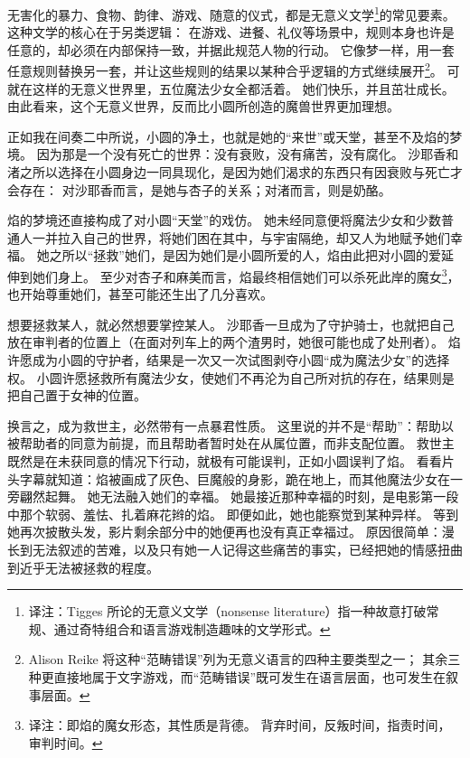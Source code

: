 无害化的暴力、食物、韵律、游戏、随意的仪式，都是无意义文学\footnote{
    译注：Tigges 所论的无意义文学（nonsense literature）指一种故意打破常规、通过奇特组合和语言游戏制造趣味的文学形式。
}的常见要素\cite{tigges1988themes-motifs-nonsense}。
这种文学的核心在于另类逻辑：
在游戏、进餐、礼仪等场景中，规则本身也许是任意的，却必须在内部保持一致，并据此规范人物的行动。
它像梦一样，用一套任意规则替换另一套，并让这些规则的结果以某种合乎逻辑的方式继续展开\footnote{%
    Alison Reike 将这种“范畴错误”列为无意义语言的四种主要类型之一；
    其余三种更直接地属于文字游戏，而“范畴错误”既可发生在语言层面，也可发生在叙事层面。
}\cite{reike1992secret-sense}。
可就在这样的无意义世界里，五位魔法少女全都活着。
她们快乐，并且茁壮成长。
由此看来，这个无意义世界，反而比小圆所创造的魔兽世界更加理想。

正如我在间奏二中所说，小圆的净土，也就是她的“来世”或天堂，甚至不及焰的梦境。
因为那是一个没有死亡的世界：没有衰败，没有痛苦，没有腐化。
沙耶香和渚之所以选择在小圆身边一同具现化，是因为她们渴求的东西只有因衰败与死亡才会存在：
对沙耶香而言，是她与杏子的关系；对渚而言，则是奶酪。

焰的梦境还直接构成了对小圆“天堂”的戏仿。
她未经同意便将魔法少女和少数普通人一并拉入自己的世界，将她们困在其中，与宇宙隔绝，却又人为地赋予她们幸福。
她之所以“拯救”她们，是因为她们是小圆所爱的人，焰由此把对小圆的爱延伸到她们身上。
至少对杏子和麻美而言，焰最终相信她们可以杀死此岸的魔女\footnote{%
    译注：即焰的魔女形态，其性质是背德。
    背弃时间，反叛时间，指责时间，审判时间。
}，也开始尊重她们，甚至可能还生出了几分喜欢。

想要拯救某人，就必然想要掌控某人。
沙耶香一旦成为了守护骑士，也就把自己放在审判者的位置上（在面对列车上的两个渣男时，她很可能也成了处刑者）。
焰许愿成为小圆的守护者，结果是一次又一次试图剥夺小圆“成为魔法少女”的选择权。
小圆许愿拯救所有魔法少女，使她们不再沦为自己所对抗的存在，结果则是把自己置于女神的位置。

换言之，成为救世主，必然带有一点暴君性质。
这里说的并不是“帮助”：帮助以被帮助者的同意为前提，而且帮助者暂时处在从属位置，而非支配位置。
救世主既然是在未获同意的情况下行动，就极有可能误判，正如小圆误判了焰。
看看片头字幕就知道：焰被画成了灰色、巨魔般的身影，跪在地上，而其他魔法少女在一旁翩然起舞。
她无法融入她们的幸福。
她最接近那种幸福的时刻，是电影第一段中那个软弱、羞怯、扎着麻花辫的焰。
即便如此，她也能察觉到某种异样。
等到她再次披散头发，影片剩余部分中的她便再也没有真正幸福过。
原因很简单：漫长到无法叙述的苦难，以及只有她一人记得这些痛苦的事实，已经把她的情感扭曲到近乎无法被拯救的程度。

